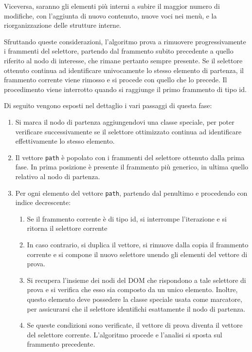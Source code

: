 \documentclass[12pt]{toptesi}
\begin{document}
Viceversa, saranno gli elementi più interni a subire il maggior numero di modifiche, con l'aggiunta di nuovo contenuto, nuove voci nei menù, e la riorganizzazione delle strutture interne.

Sfruttando queste considerazioni, l'algoritmo prova a rimuovere progressivamente i frammenti del selettore, partendo dal frammento subito precedente a quello riferito al nodo di interesse, che rimane pertanto sempre presente. Se il selettore ottenuto continua ad identificare univocamente lo stesso elemento di partenza, il frammento corrente viene rimosso e si procede con quello che lo precede. Il procedimento viene interrotto quando si raggiunge il primo frammento di tipo id.

Di seguito vengono esposti nel dettaglio i vari passaggi di questa fase:

\begin{enumerate}
\item Si marca il nodo di partenza aggiungendovi una classe speciale, per poter verificare successivamente se il selettore ottimizzato continua ad identificare effettivamente lo stesso elemento.
\item Il vettore \verb|path| è popolato con i frammenti del selettore ottenuto dalla prima fase. In prima posizione è presente il frammento più generico, in ultima quello relativo al nodo di partenza.   
\item Per ogni elemento del vettore \verb|path|, partendo dal penultimo e procedendo con indice decrescente:
	\begin{enumerate}
		\item Se il frammento corrente è di tipo id, si interrompe l'iterazione e si ritorna il selettore corrente
		\item In caso contrario, si duplica il vettore, si rimuove dalla copia il frammento corrente e si compone il nuovo selettore unendo gli elementi del vettore di prova.
		\item Si recupera l'insieme dei nodi del DOM che rispondono a tale selettore di prova e si verifica che esso sia composto da un unico elemento. Inoltre, questo elemento deve possedere la classe speciale usata come marcatore, per assicurarsi che il selettore identifichi esattamente il nodo di partenza.
		\item Se queste condizioni sono verificate, il vettore di prova diventa il vettore del selettore corrente. L'algoritmo procede e l'analisi si sposta sul frammento precedente.
	\end{enumerate}
\end{enumerate}
\end{document}
